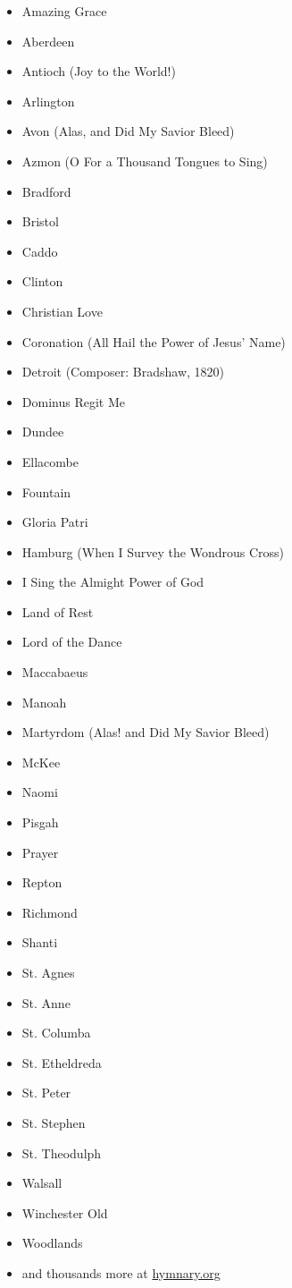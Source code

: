 \begin{itemize}
\sc\item Amazing Grace
  \item Aberdeen
	\item Antioch (\textup{Joy to the World!}) 
	\item Arlington
	\item Avon (Alas, and Did My Savior Bleed)
	\item Azmon (\textup{O For a Thousand Tongues to Sing})
	\item Bradford
	\item Bristol
	\item Caddo
	\item Clinton
	\item Christian Love
	\item Coronation \textup{(All Hail the Power of Jesus' Name)}
	\item Detroit (Composer: Bradshaw, 1820)
	\item Dominus Regit Me
	\item Dundee
	\item Ellacombe
	\item Fountain
	\item Gloria Patri
	\item Hamburg (\textup{When I Survey the Wondrous Cross})
  \item I Sing the Almight Power of God
	\item Land of Rest
	\item Lord of the Dance
	\item Maccabaeus
	\item Manoah
	\item Martyrdom (\textup{Alas! and Did My Savior Bleed})
	\item McKee
	\item Naomi
	\item Pisgah
	\item Prayer
	\item Repton
	\item Richmond
	\item Shanti
	\item St. Agnes
	\item St. Anne
	\item St. Columba
	\item St. Etheldreda
	\item St. Peter
	\item St. Stephen
	\item St. Theodulph
	\item Walsall
	\item Winchester Old
	\item Woodlands
	\item \textup{and thousands more at \href{https://hymnary.org/search?page=3&qu=meter\%3A8.6.8.6\%20in\%3Atunes&sort=totalInstances}{hymnary.org}}
\end{itemize}

